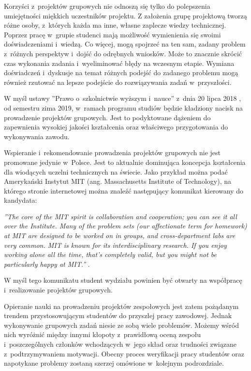 Korzyści z~projektów grupowych nie odnoszą się tylko do polepszenia umiejętności miękkich uczestników projektu.
Z założenia grupę projektową tworzą różne osoby, z~których każda ma inne, własne zaplecze wiedzy technicznej.
Poprzez pracę w~grupie studenci mają możliwość wymienienia się swoimi doświadczeniami i~wiedzą.
Co więcej, mogą spojrzeć na ten sam, zadany problem z~różnych perspektyw i~dojść do odrębnych wniosków.
Może to znacznie skrócić czas wykonania zadania i~wyeliminować błędy na wczesnym etapie. 
Wymiana doświadczeń i~dyskusje na temat różnych podejść do zadanego problemu mogą również rzutować na lepsze podejście do rozwiązywania zadań w~przyszłości.

W myśl ustawy ”Prawo o~szkolnictwie wyższym i~nauce” z~dnia 20 lipca 2018 \cite{higher-education-law}, od semestru zima 2019, w~ramach programu studiów będzie kładziony nacisk na prowadzenie projektów grupowych.
Jest to podyktowane dążeniem do zapewnienia wysokiej jakości kształcenia oraz właściwego przygotowania do wykonywania zawodu.

Wspieranie i~rekomendowanie prowadzenia projektów grupowych nie jest promowane jedynie w~Polsce.
Jest to aktualnie dominująca koncepcja kształcenia dla wiodących uczelni technicznych na świecie.
Jako przykład można podać Amerykański Instytut MIT (ang. Massachusetts Institute of Technology), na którego stronie internetowej można znaleźć następujący komunikat kierowany do kandydata:

\textit{”The core of the MIT spirit is collaboration and cooperation; you can see it all over the Institute.
Many of the problem sets (our affectionate term for homework) at MIT are designed to be worked on in groups, and cross-department labs are very common.
MIT is known for its interdisciplinary research.
If you enjoy working alone all the time, that’s completely valid, but you might not be particularly happy at MIT.”} \cite{mit-groups}.

W myśl tego komunikatu student wydziału powinien być otwarty na współpracę i~realizowanie projektów grupowych.

Opieranie nauki na prowadzeniu projektów zespołowych jest zatem pożądanym trendem przystosowującym studentów do przyszłej pracy zawodowej.
Jednak wykonywanie grupowych zadań niesie ze sobą wiele problemów.
Możemy wśród nich wyróżnić między innymi kłopoty z~prawidłową oceną zespołu i~poszczególnych członków wchodzących w~jego skład  oraz trudności związane z~podtrzymywaniem motywacji.
Obecny proces weryfikacji pracy studentów oraz napotykane problemy zostaną szerzej omówione w~kolejnym podrozdziale.

